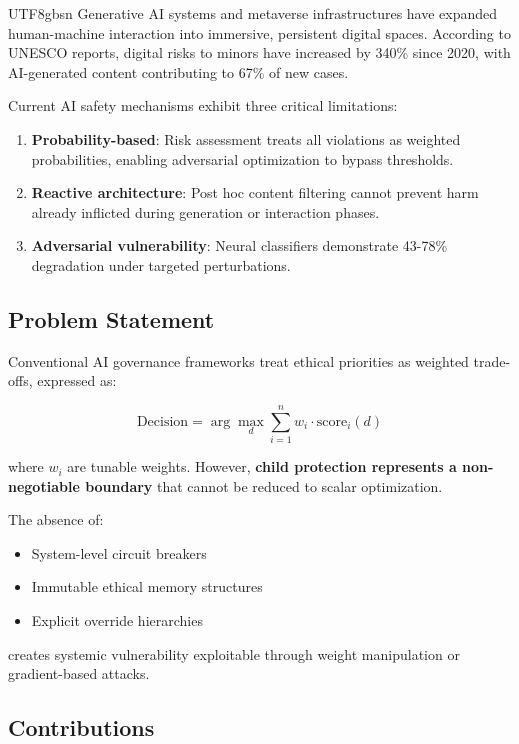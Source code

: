 \documentclass[conference]{IEEEtran}
\begin{document}
\begin{CJK}{UTF8}{gbsn}
Generative AI systems and metaverse infrastructures have expanded human-machine interaction into immersive, persistent digital spaces. According to UNESCO reports, digital risks to minors have increased by 340\% since 2020, with AI-generated content contributing to 67\% of new cases.

Current AI safety mechanisms exhibit three critical limitations:

\begin{enumerate}
    \item \textbf{Probability-based}: Risk assessment treats all violations as weighted probabilities, enabling adversarial optimization to bypass thresholds.
    
    \item \textbf{Reactive architecture}: Post hoc content filtering cannot prevent harm already inflicted during generation or interaction phases.
    
    \item \textbf{Adversarial vulnerability}: Neural classifiers demonstrate 43-78\% degradation under targeted perturbations.
\end{enumerate}

\subsection{Problem Statement}

Conventional AI governance frameworks treat ethical priorities as weighted trade-offs, expressed as:

\begin{equation}
\text{Decision} = \arg\max_{d} \sum_{i=1}^{n} w_i \cdot \text{score}_i(d)
\end{equation}

where $w_i$ are tunable weights. However, \textbf{child protection represents a non-negotiable boundary} that cannot be reduced to scalar optimization.

The absence of:
\begin{itemize}
    \item System-level circuit breakers
    \item Immutable ethical memory structures  
    \item Explicit override hierarchies
\end{itemize}
creates systemic vulnerability exploitable through weight manipulation or gradient-based attacks.

\subsection{Contributions}


\end{CJK}
\end{document}
